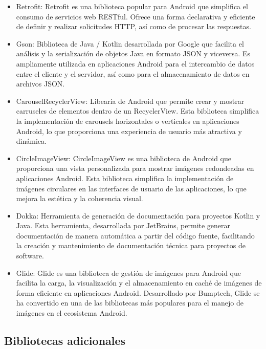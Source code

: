 \documentclass{article}
\begin{document}
    \begin{itemize}
        \item Retrofit: Retrofit es una biblioteca popular para Android que simplifica el consumo de servicios web RESTful. Ofrece una forma declarativa y eficiente de definir y realizar solicitudes HTTP, así como de procesar las respuestas.
    
        \item Gson: Biblioteca de Java / Kotlin desarrollada por Google que facilita el análisis y la serialización de objetos Java en formato JSON y viceversa. Es ampliamente utilizada en aplicaciones Android para el intercambio de datos entre el cliente y el servidor, así como para el almacenamiento de datos en archivos JSON.
    
        \item CarouselRecyclerView: Libearía de Android que permite crear y mostrar carruseles de elementos dentro de un RecyclerView. Esta biblioteca simplifica la implementación de carousels horizontales o verticales en aplicaciones Android, lo que proporciona una experiencia de usuario más atractiva y dinámica.
    
        \item CircleImageView: CircleImageView es una biblioteca de Android que proporciona una vista personalizada para mostrar imágenes redondeadas en aplicaciones Android. Esta biblioteca simplifica la implementación de imágenes circulares en las interfaces de usuario de las aplicaciones, lo que mejora la estética y la coherencia visual.
    
        \item Dokka: Herramienta de generación de documentación para proyectos Kotlin y Java. Esta herramienta, desarrollada por JetBrains, permite generar documentación de manera automática a partir del código fuente, facilitando la creación y mantenimiento de documentación técnica para proyectos de software.
    
        \item Glide: Glide es una biblioteca de gestión de imágenes para Android que facilita la carga, la visualización y el almacenamiento en caché de imágenes de forma eficiente en aplicaciones Android. Desarrollado por Bumptech, Glide se ha convertido en una de las bibliotecas más populares para el manejo de imágenes en el ecosistema Android.
    
    \end{itemize}

\subsection{Bibliotecas adicionales}
\end{document}
